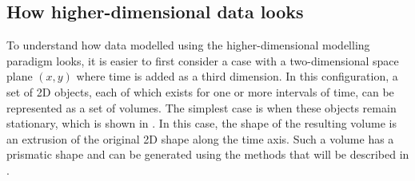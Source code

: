 \subsection{How higher-dimensional data looks}
\label{ss:agile13}

To understand how data modelled using the higher-dimensional modelling paradigm looks, it is easier to first consider a case with a two-dimensional space plane $(x,y)$ where time is added as a third dimension.
In this configuration, a set of 2D objects, each of which exists for one or more intervals of time, can be represented as a set of volumes.
The simplest case is when these objects remain stationary, which is shown in .
In this case, the shape of the resulting volume is an extrusion of the original 2D shape along the time axis.
Such a volume has a prismatic shape and can be generated using the methods that will be described in .
